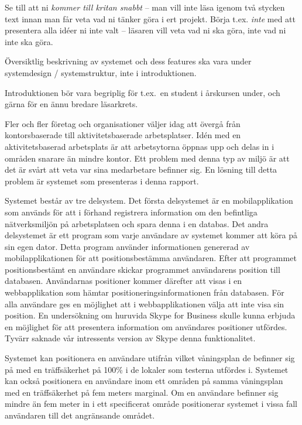 \documentclass[a4paper,12pt]{article}
\begin{document}
 Se till att ni \emph{kommer till kritan snabbt} – man vill inte läsa igenom två stycken text innan man får veta vad ni tänker göra i ert projekt.  Börja t.ex. \emph{inte} med att presentera alla idéer ni inte valt – läsaren vill veta vad ni ska göra, inte vad ni inte ska göra.

 Översiktlig beskrivning av systemet och dess features ska vara under systemdesign / systemstruktur, inte i introduktionen.

 Introduktionen bör vara begriplig för t.ex.~en student i årskursen under, och gärna för en ännu bredare läsarkrets.
 \fi

 Fler och fler företag och organisationer väljer idag att övergå från kontorsbaserade till aktivitetsbaserade arbetsplatser. Idén med en aktivitetsbaserad arbetsplats är att arbetsytorna öppnas upp och delas in i områden snarare än mindre kontor. Ett problem med denna typ av miljö är att det är svårt att veta var sina medarbetare befinner sig. En lösning till detta problem är systemet som presenteras i denna rapport.


 Systemet består av tre delsystem. Det första delsystemet är en mobilapplikation som används för att i förhand registrera information om den befintliga nätverksmiljön på arbetsplatsen och spara denna i en databas. Det andra delsystemet är ett program som varje användare av systemet kommer att köra på sin egen dator. Detta program använder informationen genererad av mobilapplikationen för att positionsbestämma användaren. Efter att programmet positionsbestämt en användare skickar programmet användarens position till databasen. Användarnas positioner kommer därefter att visas i en webbapplikation som hämtar positioneringsinformationen från databasen.
 För alla användare ges en möjlighet att i webbapplikationen välja att inte visa sin position.
 En undersökning om huruvida Skype for Business skulle kunna erbjuda en möjlighet för att presentera information om användares positioner utfördes. Tyvärr saknade vår intressents version av Skype denna funktionalitet.

 Systemet kan positionera en användare utifrån vilket våningsplan de befinner sig på med en träffsäkerhet på 100\% i de lokaler som testerna utfördes i. Systemet kan också positionera en användare inom ett områden på samma våningsplan med en träffsäkerhet på fem meters marginal. Om en användare befinner sig mindre än fem meter in i ett specificerat område positionerar systemet i vissa fall användaren till det angränsande området.
\end{document}
